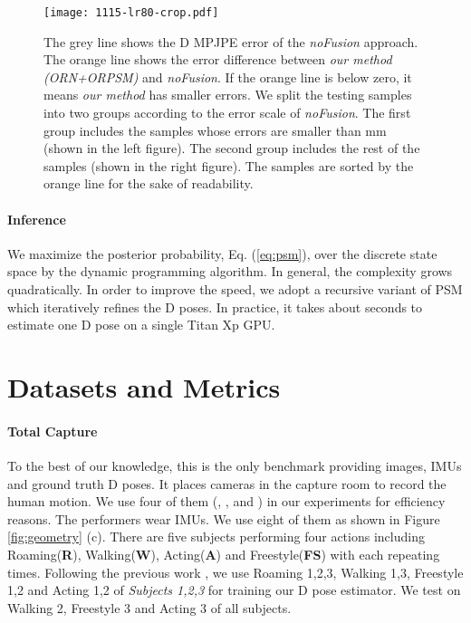 \documentclass[10pt,twocolumn,letterpaper]{article}
\begin{document}
\begin{figure*}[htbp]
\centering
\texttt{[image: 1115-lr80-crop.pdf]}
\caption{The grey line shows the D MPJPE error of the \emph{noFusion} approach. The orange line shows the error difference between \emph{our method (ORN+ORPSM)} and \emph{noFusion}. If the orange line is below zero, it means \emph{our method} has smaller errors. We split the testing samples into two groups according to the error scale of \emph{noFusion}. The first group includes the samples whose errors are smaller than mm (shown in the left figure). The second group includes the rest of the samples (shown in the right figure). The samples are sorted by the orange line for the sake of readability.}
\label{fig:ifusion-vs-nofusion}
\end{figure*}





\paragraph{Inference}
We maximize the posterior probability, \ie Eq. (\ref{eq:psm}), over the discrete state space by the dynamic programming algorithm. In general, the complexity grows quadratically. In order to improve the speed, we adopt a recursive variant of PSM \cite{qiu2019cross} which iteratively refines the D poses. In practice, it takes about  seconds to estimate one D pose on a single Titan Xp GPU.


\section{Datasets and Metrics}
\paragraph{Total Capture \cite{trumble2017total}} To the best of our knowledge, this is the only benchmark providing images, IMUs and ground truth D poses. It places  cameras in the capture room to record the human motion. We use four of them (, ,  and ) in our experiments for efficiency reasons. The performers wear  IMUs. We use eight of them as shown in Figure \ref{fig:geometry} (c). There are five subjects performing four actions including Roaming(\textbf{R}), Walking(\textbf{W}), Acting(\textbf{A}) and Freestyle(\textbf{FS}) with each repeating  times. Following the previous work \cite{trumble2017total}, we use Roaming 1,2,3, Walking 1,3, Freestyle 1,2 and Acting 1,2 of \emph{Subjects 1,2,3} for training our D pose estimator. We test on Walking 2, Freestyle 3 and Acting 3 of all subjects. 
\end{document}
